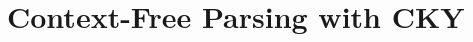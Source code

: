 \begin{comment}
	\pagebreak
\end{comment}

\section{Context-Free Parsing with CKY}
\begin{comment}
\subsection{Structure}

	\begin{itemize}
	
	\item Syntactiv Constituency
	\begin{itemize}
	\item Definition
	\item Ambiguity in Language
	\item Constituency Tests
	\end{itemize}
	
	\item Context Free Grammars
	\begin{itemize}
	\item Formal Equation
	\item Weighted CFGs
	\item The Parsing Problem
	\end{itemize}
	
	\item Parsing
	\begin{itemize}
	\item Definition
	\item Examples
	\end{itemize}
	
	\item CKY Algorithm
	\begin{itemize}
	\item Requirements
	\item In Action
	\end{itemize}
	\end{itemize}
\end{comment}

\begin{comment}
	Mathematical study of structure of sentences. There is evidence that human language is structured hierarchically. A good way to model this is by breaking the language into constituents and expressing their relationship.\\
\end{comment} 


